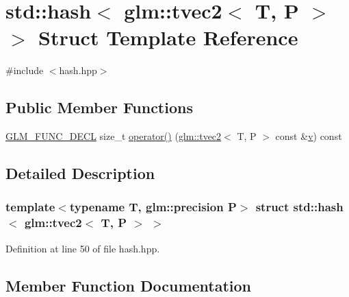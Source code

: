 \hypertarget{structstd_1_1hash_3_01glm_1_1tvec2_3_01_t_00_01_p_01_4_01_4}{}\section{std\+::hash$<$ glm\+::tvec2$<$ T, P $>$ $>$ Struct Template Reference}
\label{structstd_1_1hash_3_01glm_1_1tvec2_3_01_t_00_01_p_01_4_01_4}


{\ttfamily \#include $<$hash.\+hpp$>$}

\subsection*{Public Member Functions}
\begin{DoxyCompactItemize}
\item 
\mbox{\hyperlink{setup_8hpp_ab2d052de21a70539923e9bcbf6e83a51}{G\+L\+M\+\_\+\+F\+U\+N\+C\+\_\+\+D\+E\+CL}} size\+\_\+t \mbox{\hyperlink{structstd_1_1hash_3_01glm_1_1tvec2_3_01_t_00_01_p_01_4_01_4_a75e9bfbaf3db72556cd656f734767175}{operator()}} (\mbox{\hyperlink{structglm_1_1tvec2}{glm\+::tvec2}}$<$ T, P $>$ const \&\mbox{\hyperlink{glad_8h_a14cfbe2fc2234f5504618905b69d1e06}{v}}) const
\end{DoxyCompactItemize}


\subsection{Detailed Description}
\subsubsection*{template$<$typename T, glm\+::precision P$>$\newline
struct std\+::hash$<$ glm\+::tvec2$<$ T, P $>$ $>$}



Definition at line 50 of file hash.\+hpp.



\subsection{Member Function Documentation}
\mbox{\label{structstd_1_1hash_3_01glm_1_1tvec2_3_01_t_00_01_p_01_4_01_4_a75e9bfbaf3db72556cd656f734767175}} 
